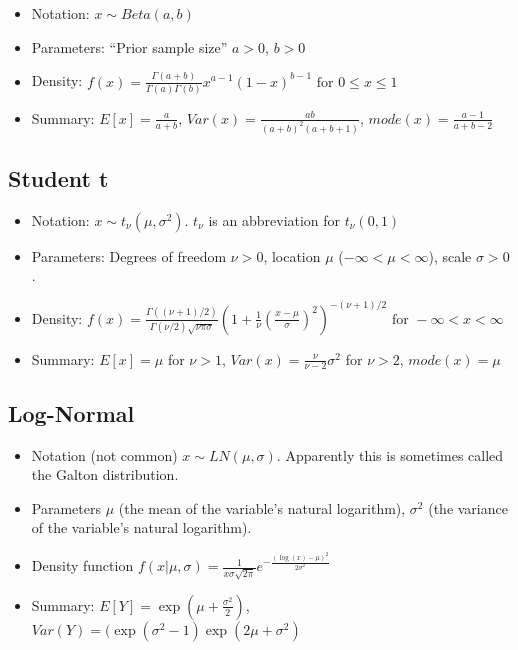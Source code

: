 \documentclass{article}
\begin{document}
\begin{itemize}
\item[] Notation: $x \sim Beta(a,b)$

\item[] Parameters: ``Prior sample size'' $a>0$, $b>0$

\item[] Density: $f(x) = \frac{\Gamma(a+b)}{\Gamma(a) \Gamma(b)} x^{a-1} (1-x)^{b-1} \mbox{ for } 0 \leq x \leq 1$

\item[] Summary: $E[x]=\frac{a}{a+b}$, $Var(x)=\frac{ab}{(a+b)^2(a+b+1)}$, $mode(x)=\frac{a-1}{a+b-2}$
\end{itemize}

\subsection{Student t}

\begin{itemize}

\item[] Notation: $x \sim t_\nu(\mu, \sigma^2)$.   $t_\nu$ is an abbreviation for $t_\nu(0,1)$

\item[] Parameters: Degrees of freedom $\nu > 0$, location $\mu$ ($-\infty < \mu < \infty$), scale $\sigma > 0$.

\item[] Density: $f(x)=\frac{\Gamma((\nu+1)/2)}{\Gamma(\nu/2)\sqrt{\nu \pi \sigma}} \left( 1 + \frac{1}{\nu} \left( \frac{x-\mu}{\sigma} \right)^2\right)^{-(\nu+1)/2} \mbox{ for } -\infty < x < \infty $

\item[] Summary: $E[x]=\mu$ for $\nu>1$, $Var(x)=\frac{\nu}{\nu-2}\sigma^2$ for $\nu>2$, $mode(x)=\mu$

\end{itemize}


\subsection{Log-Normal}

\begin{itemize}

\item[] Notation (not common) $x \sim LN(\mu, \sigma)$.   Apparently this is sometimes called the Galton distribution.

\item[] Parameters $\mu$ (the mean of the variable's natural logarithm), $\sigma^2$ (the variance of the variable's natural logarithm).

\item[] Density function $f(x|\mu, \sigma) = \frac{1}{x \sigma \sqrt{2 \pi}} e^{-\frac{(\log(x) - \mu)^2}{2 \sigma^2}}$

\item[] Summary: $E[Y] = \exp(\mu + \frac{\sigma^2}{2})$, $Var(Y) = (\exp(\sigma^2-1)\exp(2\mu + \sigma^2)$

\end{itemize}
\end{document}

